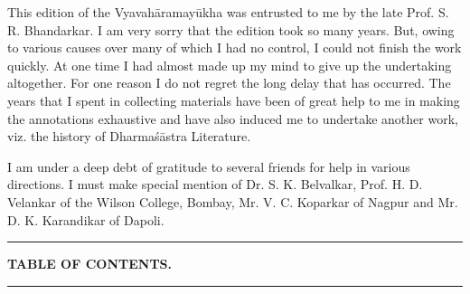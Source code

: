 \documentclass[11pt, openany]{book}
\begin{document}
This edition of the Vyavahāramayūkha was entrusted to me by the late Prof. S. R. Bhandarkar. I am very sorry that the edition took so many years. But, owing to various causes over many of which I had no control, I could not finish the work quickly. At one time I had almost made up my mind to give up the undertaking altogether. For one reason I do not regret the long delay that has occurred. The years that I spent in collecting materials have been of great help to me in making the annotations exhaustive and have also induced me to undertake another work, viz. the history of Dharmaśāstra Literature.

I am under a deep debt of gratitude to several friends for help in various directions. I must make special mention of Dr. S. K. Belvalkar, Prof. H. D. Velankar of the Wilson College, Bombay, Mr. V. C. Koparkar of Nagpur and Mr. D. K. Karandikar of Dapoli.

\begin{center}
\rule{0.2\linewidth}{0.5pt}
\end{center}

\newpage
\thispagestyle{empty}
\begin{center}
\textbf{\LARGE TABLE OF CONTENTS.}\\
\rule{0.5\linewidth}{0.5pt}
\end{center}
\end{document}
